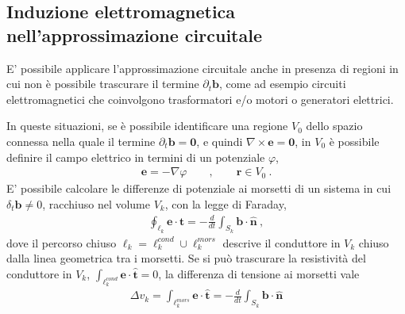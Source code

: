 \documentclass[letterpaper,10pt,english]{jupyterBook}
\begin{document}
\subsection{Induzione elettromagnetica nell’approssimazione circuitale}
\label{\detokenize{ch/circuits-electric-induction:induzione-elettromagnetica-nell-approssimazione-circuitale}}\label{\detokenize{ch/circuits-electric-induction:classical-electromagnetism-circuits-electric-induction}}\label{\detokenize{ch/circuits-electric-induction::doc}}
\sphinxAtStartPar
E’ possibile applicare l’approssimazione circuitale anche in presenza di regioni in cui non è possibile trascurare il termine \(\partial_t \mathbf{b}\), come ad esempio circuiti elettromagnetici che coinvolgono trasformatori e/o motori o generatori elettrici.

\sphinxAtStartPar
In queste situazioni, se è possibile identificare una regione \(V_0\) dello spazio connessa nella quale il termine \(\partial_t \mathbf{b} = \mathbf{0}\), e quindi \(\nabla \times \mathbf{e} = \mathbf{0}\), in \(V_0\) è possibile definire il campo elettrico in termini di un potenziale \(\varphi\),
\begin{equation*}
\begin{split}\mathbf{e} = - \nabla \varphi \qquad , \qquad \mathbf{r} \in V_0 \ .\end{split}
\end{equation*}
\sphinxAtStartPar
E’ possibile calcolare le differenze di potenziale ai morsetti di un sistema in cui \(\delta_t \mathbf{b} \ne 0\), racchiuso nel volume \(V_k\), con la legge di Faraday,
\begin{equation*}
\begin{split}\oint_{\ell_k} \mathbf{e} \cdot \hat{\mathbf{t}} = - \frac{d}{dt} \int_{S_k} \mathbf{b} \cdot \hat{\mathbf{n}} \ ,\end{split}
\end{equation*}
\sphinxAtStartPar
dove il percorso chiuso \(\ell_k = \ell_k^{cond} \cup \ell_k^{mors}\) descrive il conduttore in \(V_k\) chiuso dalla linea geometrica tra i morsetti. Se si può trascurare la resistività del conduttore in \(V_k\), \(\int_{\ell_k^{cond}} \mathbf{e} \cdot \hat{\mathbf{t}} = 0\), la differenza di tensione ai morsetti vale
\begin{equation*}
\begin{split}\Delta v_k = \int_{\ell^{mors}_k} \mathbf{e} \cdot \hat{\mathbf{t}} = - \frac{d}{dt} \int_{S_k} \mathbf{b} \cdot \hat{\mathbf{n}}\end{split}
\end{equation*}
\sphinxstepscope
\end{document}
